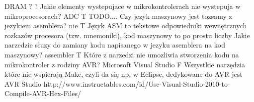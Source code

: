 {DRAM}
{?}
{?}
{}
\answer
{Jakie elementy wystepujace w mikrokontrolerach nie wystepuja w mikroprocesorach?}
{ADC}
{T}
{TODO....}
{}
\answer
{Czy jezyk maszynowy jest tozsamy z jezykiem asemblera? }
{nie}
{T}
{}
{Język ASM to tekstowe odpowiedniki wewnętrznych rozkazów procesora (tzw. mnemoniki), kod maszynowy to po prostu liczby}
\answer
{Jakie narzedzie słuzy do zamiany kodu napisanego w jezyku asemblera na kod maszynowy? }
{assembler}
{T}
{}
{}
\answer
{Które z narzedzi nie umozliwia stworzenia kodu na mikrokontroler z rodziny AVR?}
{Microsoft Visual Studio
}
{F}
{Wszystkie narzędzia które nie wspierają Make, czyli da się np. w Eclipse, dedykowane do AVR jest AVR Studio}
{http://www.instructables.com/id/Use-Visual-Studio-2010-to-Compile-AVR-Hex-Files/}
